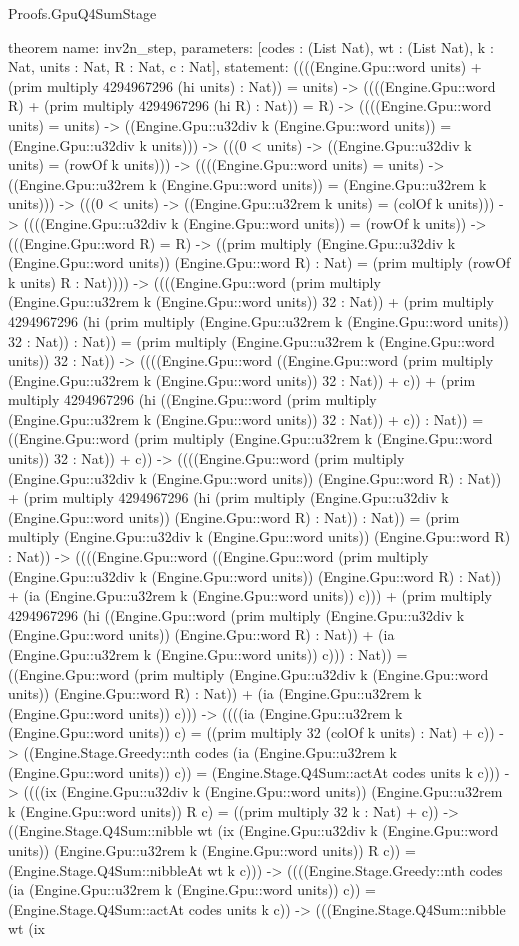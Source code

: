 \begin{lexlean}{Proofs.GpuQ4SumStage}
\begin{semanticmodule}
theorem{
  name: inv2n_step,
  parameters: [codes : (List Nat), wt : (List Nat), k : Nat, units : Nat, R : Nat, c : Nat],
  statement: ((((Engine.Gpu::word units) + (prim multiply 4294967296 (hi units) : Nat)) = units) -> ((((Engine.Gpu::word R) + (prim multiply 4294967296 (hi R) : Nat)) = R) -> ((((Engine.Gpu::word units) = units) -> ((Engine.Gpu::u32div k (Engine.Gpu::word units)) = (Engine.Gpu::u32div k units))) -> (((0 < units) -> ((Engine.Gpu::u32div k units) = (rowOf k units))) -> ((((Engine.Gpu::word units) = units) -> ((Engine.Gpu::u32rem k (Engine.Gpu::word units)) = (Engine.Gpu::u32rem k units))) -> (((0 < units) -> ((Engine.Gpu::u32rem k units) = (colOf k units))) -> ((((Engine.Gpu::u32div k (Engine.Gpu::word units)) = (rowOf k units)) -> (((Engine.Gpu::word R) = R) -> ((prim multiply (Engine.Gpu::u32div k (Engine.Gpu::word units)) (Engine.Gpu::word R) : Nat) = (prim multiply (rowOf k units) R : Nat)))) -> ((((Engine.Gpu::word (prim multiply (Engine.Gpu::u32rem k (Engine.Gpu::word units)) 32 : Nat)) + (prim multiply 4294967296 (hi (prim multiply (Engine.Gpu::u32rem k (Engine.Gpu::word units)) 32 : Nat)) : Nat)) = (prim multiply (Engine.Gpu::u32rem k (Engine.Gpu::word units)) 32 : Nat)) -> ((((Engine.Gpu::word ((Engine.Gpu::word (prim multiply (Engine.Gpu::u32rem k (Engine.Gpu::word units)) 32 : Nat)) + c)) + (prim multiply 4294967296 (hi ((Engine.Gpu::word (prim multiply (Engine.Gpu::u32rem k (Engine.Gpu::word units)) 32 : Nat)) + c)) : Nat)) = ((Engine.Gpu::word (prim multiply (Engine.Gpu::u32rem k (Engine.Gpu::word units)) 32 : Nat)) + c)) -> ((((Engine.Gpu::word (prim multiply (Engine.Gpu::u32div k (Engine.Gpu::word units)) (Engine.Gpu::word R) : Nat)) + (prim multiply 4294967296 (hi (prim multiply (Engine.Gpu::u32div k (Engine.Gpu::word units)) (Engine.Gpu::word R) : Nat)) : Nat)) = (prim multiply (Engine.Gpu::u32div k (Engine.Gpu::word units)) (Engine.Gpu::word R) : Nat)) -> ((((Engine.Gpu::word ((Engine.Gpu::word (prim multiply (Engine.Gpu::u32div k (Engine.Gpu::word units)) (Engine.Gpu::word R) : Nat)) + (ia (Engine.Gpu::u32rem k (Engine.Gpu::word units)) c))) + (prim multiply 4294967296 (hi ((Engine.Gpu::word (prim multiply (Engine.Gpu::u32div k (Engine.Gpu::word units)) (Engine.Gpu::word R) : Nat)) + (ia (Engine.Gpu::u32rem k (Engine.Gpu::word units)) c))) : Nat)) = ((Engine.Gpu::word (prim multiply (Engine.Gpu::u32div k (Engine.Gpu::word units)) (Engine.Gpu::word R) : Nat)) + (ia (Engine.Gpu::u32rem k (Engine.Gpu::word units)) c))) -> ((((ia (Engine.Gpu::u32rem k (Engine.Gpu::word units)) c) = ((prim multiply 32 (colOf k units) : Nat) + c)) -> ((Engine.Stage.Greedy::nth codes (ia (Engine.Gpu::u32rem k (Engine.Gpu::word units)) c)) = (Engine.Stage.Q4Sum::actAt codes units k c))) -> ((((ix (Engine.Gpu::u32div k (Engine.Gpu::word units)) (Engine.Gpu::u32rem k (Engine.Gpu::word units)) R c) = ((prim multiply 32 k : Nat) + c)) -> ((Engine.Stage.Q4Sum::nibble wt (ix (Engine.Gpu::u32div k (Engine.Gpu::word units)) (Engine.Gpu::u32rem k (Engine.Gpu::word units)) R c)) = (Engine.Stage.Q4Sum::nibbleAt wt k c))) -> ((((Engine.Stage.Greedy::nth codes (ia (Engine.Gpu::u32rem k (Engine.Gpu::word units)) c)) = (Engine.Stage.Q4Sum::actAt codes units k c)) -> (((Engine.Stage.Q4Sum::nibble wt (ix }
\end{semanticmodule}
\end{lexlean}
